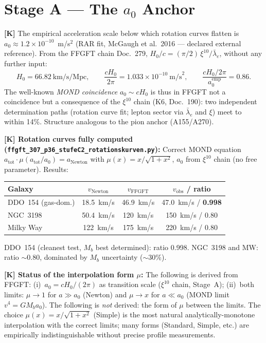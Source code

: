 \section{Stage A — The $a_0$ Anchor}

\textbf{[K]} The empirical acceleration scale below which rotation
curves flatten is $a_0 \approx 1.2\times10^{-10}$~m/s$^2$
(RAR fit, McGaugh et al.\ 2016 — declared external reference).
From the FFGFT chain Doc.~279,
$H_0/c = (\pi/2)\,\xi^{10}/\bar\lambda_e$, without any further input:
\[
  H_0 = 66.82~\text{km/s/Mpc}, \qquad
  \frac{cH_0}{2\pi} = 1.033\times10^{-10}~\text{m/s}^2,
  \qquad \frac{cH_0/2\pi}{a_0^{\text{emp}}} = 0.86.
\]
The well-known \emph{MOND coincidence} $a_0 \sim cH_0$ is thus in FFGFT
not a coincidence but a consequence of the $\xi^{10}$ chain
(K6, Doc.~190): two independent determination paths
(rotation curve fit; lepton sector via $\bar\lambda_e$ and $\xi$)
meet to within 14\%. Structure analogous to the pion anchor (A155/A270).

\medskip
\textbf{[K] Rotation curves fully computed
(\texttt{ffgft\_307\_p36\_stufeC2\_rotationskurven.py}):}
Correct MOND equation $a_\text{tot}\cdot\mu(a_\text{tot}/a_0) =
a_\text{Newton}$ with $\mu(x) = x/\sqrt{1+x^2}$, $a_0$ from
$\xi^{10}$ chain (no free parameter). Results:

\begin{center}
\begin{tabular}{lccc}
\toprule
Galaxy & $v_\text{Newton}$ & $v_\text{FFGFT}$ & $v_\text{obs}$ / ratio \\
\midrule
DDO~154 (gas-dom.)  & 18.5~km/s & 46.9~km/s & 47.0~km/s / \textbf{0.998} \\
NGC~3198            & 50.4~km/s & 120~km/s  & 150~km/s / 0.80 \\
Milky Way           & 122~km/s  & 175~km/s  & 220~km/s / 0.80 \\
\bottomrule
\end{tabular}
\end{center}

DDO~154 (cleanest test, $M_b$ best determined): ratio 0.998.
NGC~3198 and MW: ratio $\sim$0.80, dominated by $M_b$ uncertainty
($\sim$30\%).

\medskip
\textbf{[K] Status of the interpolation form $\mu$:}
The following is derived from FFGFT:
(i)~$a_0 = cH_0/(2\pi)$ as transition scale ($\xi^{10}$ chain, Stage~A);
(ii)~both limits: $\mu \to 1$ for $a \gg a_0$ (Newton) and
$\mu \to x$ for $a \ll a_0$ (MOND limit $v^4 = GM_b a_0$).
The following is \emph{not} derived: the form of $\mu$ between the limits.
The choice $\mu(x) = x/\sqrt{1+x^2}$ (Simple) is the most natural
analytically-monotone interpolation with the correct limits; many forms
(Standard, Simple, etc.) are empirically indistinguishable without
precise profile measurements.

